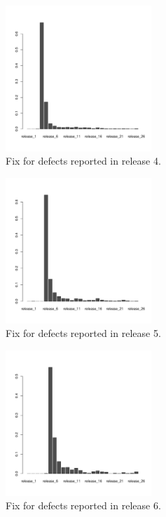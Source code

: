 \begin{figure}[thb!]
      \caption{Fix for defects reported in release 4.}
      \label{fig:defect_release_4}
      \includegraphics[width=0.49\textwidth]{figures/r4}
\end{figure}

\begin{figure}[thb!]
      \caption{Fix for defects reported in release 5.}
      \label{fig:defect_release_5}
      \includegraphics[width=0.49\textwidth]{figures/r5}
\end{figure}

\begin{figure}[thb!]
      \caption{Fix for defects reported in release 6.}
      \label{fig:app_defect_release_6}
      \includegraphics[width=0.49\textwidth]{figures/r6}
\end{figure}

